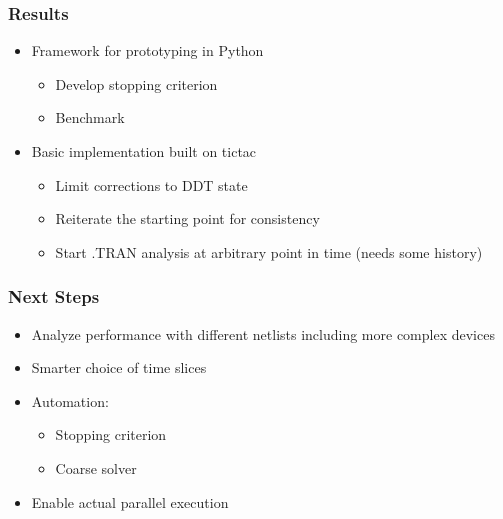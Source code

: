 \begin{frame}
\frametitle{Results}
\begin{itemize}[<+->]
    \item Framework for prototyping in Python
        \begin{itemize}
            \item Develop stopping criterion
            \item Benchmark
        \end{itemize}
    \item Basic implementation built on tictac
        \begin{itemize}
            \item Limit corrections to DDT state
            \item Reiterate the starting point for consistency
            \item Start .TRAN analysis at arbitrary point in time (needs some history)
        \end{itemize}
\end{itemize}
\end{frame}

\begin{frame}
\frametitle{Next Steps}
\begin{itemize}[<+->]
    \item Analyze performance with different netlists including more complex devices
    \item Smarter choice of time slices
    \item Automation:
        \begin{itemize}
            \item Stopping criterion
            \item Coarse solver
        \end{itemize}
    \item Enable actual parallel execution
\end{itemize}
\end{frame}
